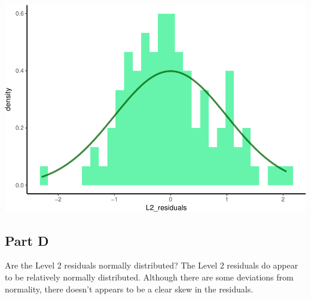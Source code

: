 \documentclass[]{article}
\newenvironment{Shaded}{\begin{snugshade}}{\end{snugshade}}
\newcommand{\KeywordTok}[1]{\textcolor[rgb]{0.13,0.29,0.53}{\textbf{#1}}}
\newcommand{\DataTypeTok}[1]{\textcolor[rgb]{0.13,0.29,0.53}{#1}}
\newcommand{\DecValTok}[1]{\textcolor[rgb]{0.00,0.00,0.81}{#1}}
\newcommand{\FloatTok}[1]{\textcolor[rgb]{0.00,0.00,0.81}{#1}}
\newcommand{\StringTok}[1]{\textcolor[rgb]{0.31,0.60,0.02}{#1}}
\newcommand{\OperatorTok}[1]{\textcolor[rgb]{0.81,0.36,0.00}{\textbf{#1}}}
\newcommand{\NormalTok}[1]{#1}
\begin{document}
\begin{Shaded}
\end{Shaded}

\includegraphics{Beck_HW_5_R_2_files/figure-latex/unnamed-chunk-10-1.pdf}

\subsection{Part D}\label{part-d-2}

Are the Level 2 residuals normally distributed? The Level 2 residuals do
appear to be relatively normally distributed. Although there are some
deviations from normality, there doesn't appears to be a clear skew in
the residuals.
\end{document}
